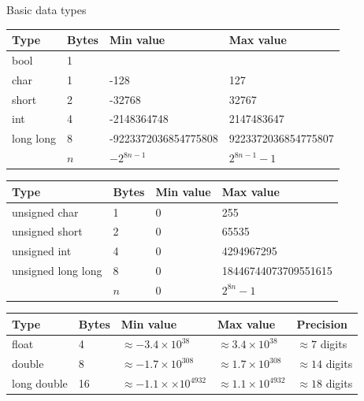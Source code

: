 \documentclass[10pt]{beamer}
\begin{document}
\begin{frame}{Basic data types}

    {\scriptsize
        \begin{center}
            \begin{tabular}{l|lll}
                Type & Bytes & Min value & Max value \\
                \hline
                bool & 1 & & \\
                char & 1 & -128 & 127 \\
                short & 2 & -32768 & 32767 \\
                int & 4 & -2148364748 & 2147483647 \\
                long long & 8 & -9223372036854775808 & 9223372036854775807 \\
                          & $n$ & $-2^{8n-1}$ & $2^{8n-1}-1$
            \end{tabular}
        \end{center}
    }

    {\scriptsize
        \begin{center}
            \begin{tabular}{l|lll}
                Type & Bytes & Min value & Max value \\
                \hline
                unsigned char & 1 & 0 & 255 \\
                unsigned short & 2 & 0 & 65535 \\
                unsigned int & 4 & 0 & 4294967295 \\
                unsigned long long & 8 & 0 & 18446744073709551615 \\
                    & $n$ & $0$ & $2^{8n}-1$
            \end{tabular}
        \end{center}
    }

    {\scriptsize
        \begin{center}
            \begin{tabular}{l|llll}
                Type & Bytes & Min value & Max value & Precision \\
                \hline
                float & 4 & $\approx -3.4\times 10^{38}$ & $\approx 3.4\times 10^{38}$ & $\approx 7$ digits \\
                double & 8 & $\approx -1.7\times 10^{308}$ & $\approx 1.7\times 10^{308}$ & $\approx 14$ digits \\
                long double & 16 & $\approx -1.1\times\times 10^{4932}$ & $\approx 1.1\times 10^{4932}$ & $\approx 18$ digits \\
            \end{tabular}
        \end{center}
    }

\end{frame}
\end{document}
